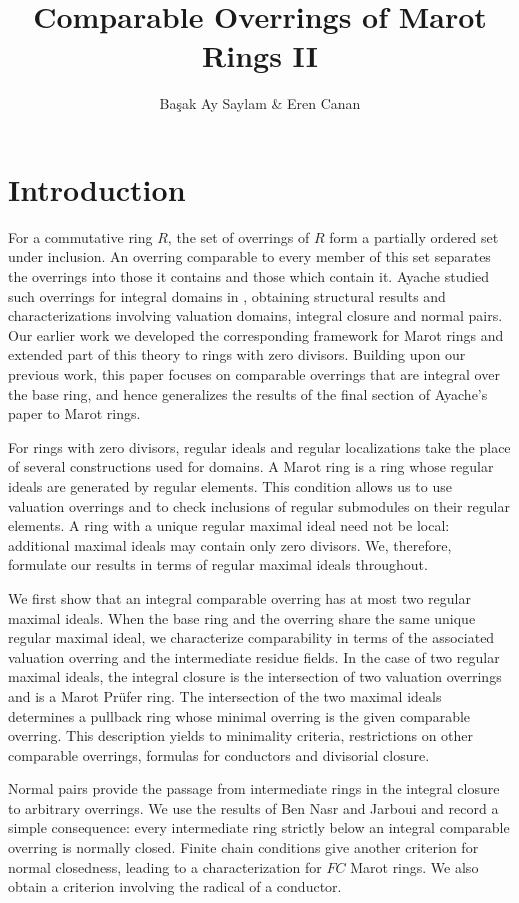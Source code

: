 \documentclass[12pt]{article}
\title{Comparable Overrings of Marot Rings II}
\author{Ba\c{s}ak Ay Saylam \& Eren Canan}
\date{}
\begin{document}
	\maketitle

\section{Introduction}

    For a commutative ring $R$, the  set of overrings of $R$ form a partially ordered set under inclusion. An overring comparable to every member of this set separates the overrings into those it contains and those which contain it. Ayache studied such overrings for integral domains in \cite{ayache}, obtaining structural results and characterizations involving valuation domains, integral closure and normal pairs. Our earlier work \cite{marot} we developed the corresponding framework for Marot rings and extended part of this theory to rings with zero divisors. Building upon our previous work, this paper focuses on comparable overrings that are integral over the base ring, and hence generalizes the results of the final section of Ayache's paper \cite{ayache} to Marot rings.

    For rings with zero divisors, regular ideals and regular localizations take the place of several constructions used for domains. A Marot ring is a ring whose regular ideals are generated by regular elements. This condition allows us to use valuation overrings and to check inclusions of regular submodules on their regular elements. A ring with a unique regular maximal ideal need not be local: additional maximal ideals may contain only zero divisors. We, therefore, formulate our results in terms of regular maximal ideals throughout.

    We first show that an integral comparable overring has at most two regular maximal ideals. When the base ring and the overring share the same unique regular maximal ideal, we characterize comparability in terms of the associated valuation overring and the intermediate residue fields. In the case of two regular maximal ideals, the integral closure is the intersection of two valuation overrings and is a Marot Prüfer ring. The intersection of the two maximal ideals determines a pullback ring whose minimal overring is the given comparable overring. This description yields to minimality criteria, restrictions on other comparable overrings, formulas for conductors and divisorial closure.

    Normal pairs provide the passage from intermediate rings in the integral closure to arbitrary overrings. We use the results of Ben Nasr and Jarboui \cite{normal-pairs} and record a simple consequence: every intermediate ring strictly below an integral comparable overring is normally closed. Finite chain conditions give another criterion for normal closedness, leading to a characterization for $FC$ Marot rings. We also obtain a criterion involving the radical of a conductor.
	
\end{document}
